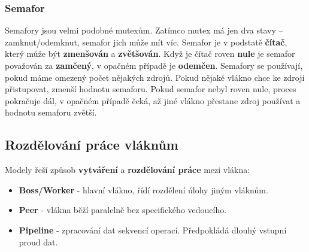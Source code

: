 \subsubsection{Semafor}
Semafory jsou velmi podobné mutexům. Zatímco mutex má jen dva stavy – zamknut/odemknut, semafor jich může mít víc. Semafor je v podstatě \textbf{čítač}, který může být \textbf{zmenšován} a \textbf{zvětšován}. Když je čítač roven \textbf{nule} je semafor považován za \textbf{zamčený}, v opačném případě je \textbf{odemčen}. Semafory se používají, pokud máme omezený počet nějakých zdrojů. Pokud nějaké vlákno chce ke zdroji přistupovat, zmenší hodnotu semaforu. Pokud semafor nebyl roven nule, proces pokračuje dál, v opačném případě čeká, až jiné vlákno přestane zdroj používat a hodnotu semaforu zvětší.

\subsection{Rozdělování práce vláknům}
Modely řeší způsob \textbf{vytváření} a \textbf{rozdělování práce} mezi vlákna:
\begin{itemize}
	\item \textbf{Boss/Worker} - hlavní vlákno, řídí rozdělení úlohy jiným vláknům.
	\item \textbf{Peer} - vlákna běží paralelně bez specifického vedoucího.
	\item \textbf{Pipeline} - zpracování dat sekvencí operací. Předpokládá dlouhý vstupní proud dat.
\end{itemize}